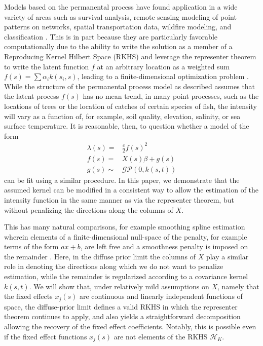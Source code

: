 \documentclass[ejsv2,preprint]{imsart}
\begin{document}
Models based on the permanental process have found application in a wide variety of areas such as survival analysis, remote sensing modeling of point patterns on networks,  spatial transportation data, wildfire modeling, and classification \cite{kim2023survivalpermprocs,PoissonRatioUQ,mine_permproc,coxprocessesnetworks,sellier2023sparse,thongtha2023normal,yang2012permprocclassification}. This is in part because they are particularly favorable computationally due to the ability to write the solution as a member of a Reproducing Kernel Hilbert Space (RKHS) and leverage the representer theorem to write the latent function $f$ at an arbitrary location as a weighted sum $f(s)=\sum\alpha_ik(s_i,s)$, leading to a finite-dimensional optimization problem \cite{pmlr-v54-flaxman17a,pmlr-v70-walder17a}. 
While the structure of the permanental process model as described assumes that the latent process $f(s)$ has no mean trend, in many point processes, such as the locations of trees or the location of catches of certain species of fish, the intensity will vary as a function of, for example, soil quality, elevation, salinity, or sea surface temperature. It is reasonable, then, to question whether a model of the form
\begin{equation}\label{eq:lambda_fixedeffects}
    \begin{split}
        \lambda(s)=&\frac{c}{2}f(s)^2 \\
        f(s)=&X(s)\beta+g(s)\\
        g(s)\sim&\mathcal{GP}(0,k(s,t))
    \end{split}
\end{equation}
can be fit using a similar procedure. In this paper, we demonstrate that the assumed kernel can be modified in a consistent way to allow the estimation of the intensity function in the same manner as \cite{pmlr-v54-flaxman17a} via the representer theorem, but without penalizing the directions along the columns of $X$. 

This has many natural comparisons, for example smoothing spline estimation wherein elements of a finite-dimensional null-space of the penalty, for example terms of the form $ax+b$, are left free and a smoothness penalty is imposed on the remainder \cite{kimeldorfwahba1970correspondence,wahba1990spline}. Here, in the diffuse prior limit the columns of $X$ play a similar role in denoting the directions along which we do not want to penalize estimation, while the remainder is regularized according to a covariance kernel $k(s,t)$. We will show that, under relatively mild assumptions on $X$, namely that the fixed effects $x_j(s)$ are continuous and linearly independent functions of space, the diffuse-prior limit defines a valid RKHS in which the representer theorem continues to apply, and also yields a straightforward decomposition allowing the recovery of the fixed effect coefficients. Notably, this is possible even if the fixed effect functions $x_j(s)$ are not elements of the RKHS $\mathcal{H}_K$.
\end{document}
